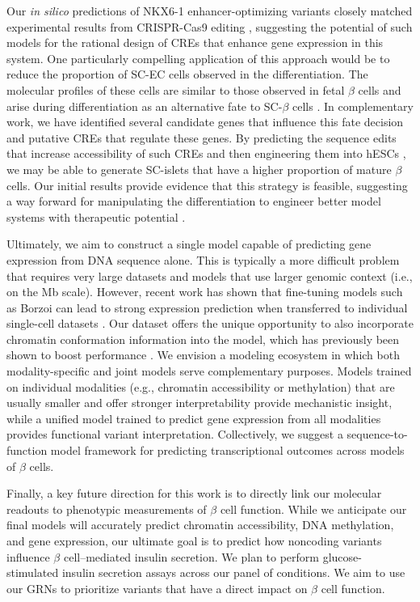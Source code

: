 Our \textit{in silico} predictions of NKX6-1 enhancer-optimizing variants closely matched experimental results from CRISPR-Cas9 editing \cite{Geusz2021-mr}, suggesting the potential of such models for the rational design of CREs that enhance gene expression in this system. One particularly compelling application of this approach would be to reduce the proportion of SC-EC cells observed in the differentiation. The molecular profiles of these cells are similar to those observed in fetal $\beta$ cells and arise during differentiation as an alternative fate to SC-$\beta$ cells \cite{Zhu2023-qm}. In complementary work, we have identified several candidate genes that influence this fate decision and putative CREs that regulate these genes. By predicting the sequence edits that increase accessibility of such CREs and then engineering them into hESCs \cite{Porto2020-ve,Komor2016-px}, we may be able to generate SC-islets that have a higher proportion of mature $\beta$ cells. Our initial results provide evidence that this strategy is feasible, suggesting a way forward for manipulating the differentiation to engineer better model systems with therapeutic potential \cite{Liu2023-kd}.

Ultimately, we aim to construct a single model capable of predicting gene expression from DNA sequence alone. This is typically a more difficult problem that requires very large datasets and models that use larger genomic context (i.e., on the Mb scale). However, recent work has shown that fine-tuning models such as Borzoi \cite{Linder2025-or} can lead to strong expression prediction when transferred to individual single-cell datasets \cite{Hingerl2024-qq}. Our dataset offers the unique opportunity to also incorporate chromatin conformation information into the model, which has previously been shown to boost performance \cite{Karbalayghareh2022-gt}. We envision a modeling ecosystem in which both modality-specific and joint models serve complementary purposes. Models trained on individual modalities (e.g., chromatin accessibility or methylation) that are usually smaller and offer stronger interpretability provide mechanistic insight, while a unified model trained to predict gene expression from all modalities provides functional variant interpretation. Collectively, we suggest a sequence-to-function model framework for predicting transcriptional outcomes across models of $\beta$ cells.

Finally, a key future direction for this work is to directly link our molecular readouts to phenotypic measurements of $\beta$ cell function. While we anticipate our final models will accurately predict chromatin accessibility, DNA methylation, and gene expression, our ultimate goal is to predict how noncoding variants influence $\beta$ cell–mediated insulin secretion. We plan to perform glucose-stimulated insulin secretion assays \cite{Velazco-Cruz2019-yq} across our panel of conditions. We aim to use our GRNs to prioritize variants that have a direct impact on $\beta$ cell function.

